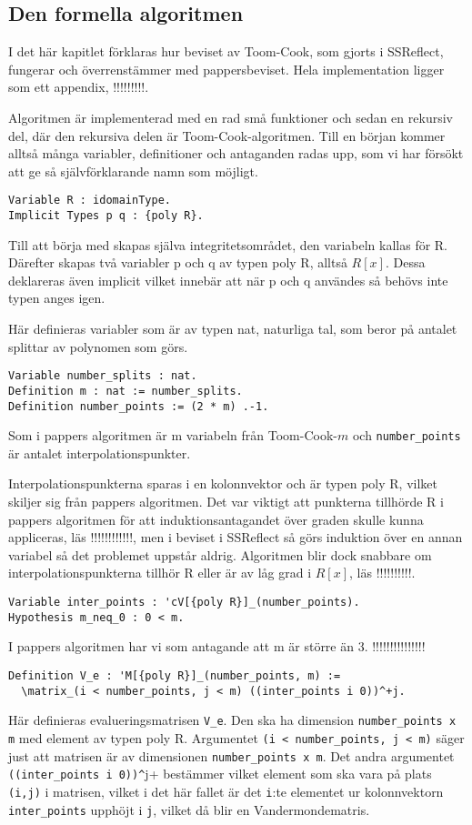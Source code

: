 \subsection{Den formella algoritmen}
I det här kapitlet förklaras hur beviset av Toom-Cook, som gjorts i SSReflect,
fungerar och överrenstämmer med pappersbeviset. Hela implementation ligger som
ett appendix, !!!!!!!!!.

Algoritmen är implementerad med en rad små funktioner och sedan en rekursiv
del, där den rekursiva delen är Toom-Cook-algoritmen. Till en början kommer
alltså många variabler, definitioner och antaganden radas upp, som vi har
försökt att ge så självförklarande namn som möjligt.
\begin{verbatim}
Variable R : idomainType.
Implicit Types p q : {poly R}.
\end{verbatim}
Till att börja med skapas själva integritetsområdet, den variabeln kallas för
R. Därefter skapas två variabler p och q av typen poly R, alltså $R[x]$. Dessa
deklareras även implicit vilket innebär att när p och q användes så behövs inte
typen anges igen.

Här definieras variabler som är av typen nat, naturliga tal, som beror på
antalet splittar av polynomen som görs.
\begin{verbatim}
Variable number_splits : nat.
Definition m : nat := number_splits.
Definition number_points := (2 * m) .-1.
\end{verbatim}
Som i pappers algoritmen är m variabeln från Toom-Cook-$m$ och
\verb+number_points+ är antalet interpolationspunkter.

Interpolationspunkterna sparas i en kolonnvektor och är typen poly R, vilket
skiljer sig från pappers algoritmen. Det var viktigt att punkterna tillhörde R
i pappers algoritmen för att induktionsantagandet över graden skulle kunna
appliceras, läs !!!!!!!!!!!!, men i beviset i SSReflect så görs induktion över
en annan variabel så det problemet uppstår aldrig. Algoritmen blir dock
snabbare om interpolationspunkterna tillhör R eller är av låg grad i $R[x]$,
läs !!!!!!!!!!.

\begin{verbatim}
Variable inter_points : 'cV[{poly R}]_(number_points).
Hypothesis m_neq_0 : 0 < m.
\end{verbatim}
I pappers algoritmen har vi som antagande att m är större än 3. !!!!!!!!!!!!!!!
\begin{verbatim}
Definition V_e : 'M[{poly R}]_(number_points, m) :=
  \matrix_(i < number_points, j < m) ((inter_points i 0))^+j.
\end{verbatim}
Här definieras evalueringsmatrisen \verb+V_e+. Den ska ha dimension
\verb+number_points x m+ med element av typen poly R. Argumentet
\verb+(i < number_points, j < m)+ säger just att matrisen är av dimensionen
\verb+number_points x m+. Det andra argumentet \verb+((inter_points i 0))^+j+
bestämmer vilket element som ska vara på plats \verb+(i,j)+ i matrisen, vilket
i det här fallet är det \verb+i+:te elementet ur kolonnvektorn
\verb+inter_points+ upphöjt i \verb+j+, vilket då blir en Vandermondematris.

